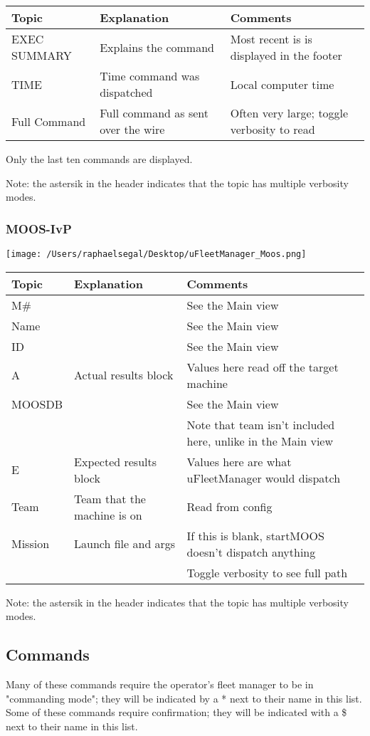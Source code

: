 \documentclass[11pt]{article}
\begin{document}
\begin{tabular}{l|ll}
Topic & Explanation & Comments\\
\hline
EXEC SUMMARY & Explains the command & Most recent is is displayed in the footer\\
TIME & Time command was dispatched & Local computer time\\
Full Command & Full command as sent over the wire & Often very large; toggle verbosity to read
\end{tabular}

Only the last ten commands are displayed. 

Note: the astersik in the header indicates that the topic has multiple verbosity modes.
\subsubsection{MOOS-IvP}
\texttt{[image: /Users/raphaelsegal/Desktop/uFleetManager\_Moos.png]}

\begin{tabular}{l|ll}
Topic & Explanation & Comments\\
\hline
M\# && See the Main view\\
Name && See the Main view\\
ID && See the Main view\\
A & Actual results block & Values here read off the target machine\\
MOOSDB && See the Main view\\&&Note that team isn't included here, unlike in the Main view\\
E & Expected results block & Values here are what uFleetManager would dispatch\\
Team & Team that the machine is on & Read from config\\
Mission & Launch file and args & If this is blank, startMOOS doesn't dispatch anything\\ && Toggle verbosity to see full path\\
\end{tabular}

Note: the astersik in the header indicates that the topic has multiple verbosity modes.

\subsection{Commands}
Many of these commands require the operator's fleet manager to be in "commanding mode"; they will be indicated by a * next to their name in this list. Some of these commands require confirmation; they will be indicated with a \$ next to their name in this list.
\end{document}

